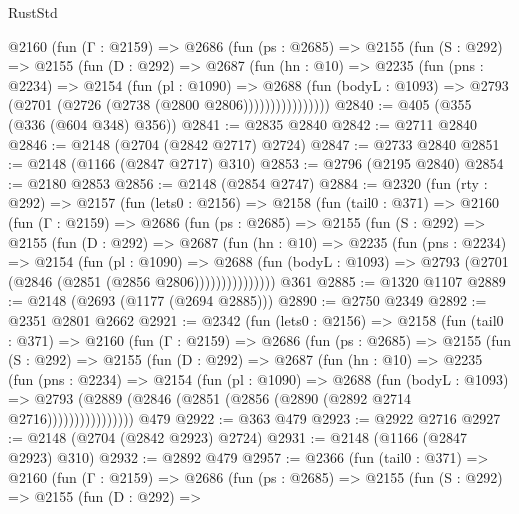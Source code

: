 \begin{lexlean}{RustStd}
\begin{coremodule}
          @2160
            (fun (Γ : @2159) =>
            @2686
              (fun (ps : @2685) =>
              @2155
                (fun (S : @292) =>
                @2155
                  (fun (D : @292) =>
                  @2687
                    (fun (hn : @10) =>
                    @2235
                      (fun (pns : @2234) =>
                      @2154
                        (fun (pl : @1090) =>
                        @2688
                          (fun (bodyL : @1093) =>
                          @2793 (@2701 (@2726 (@2738 (@2800 @2806))))))))))))))))
@2840 := @405 (@355 (@336 (@604 @348) @356))
@2841 := @2835 @2840
@2842 := @2711 @2840
@2846 := @2148 (@2704 (@2842 @2717) @2724)
@2847 := @2733 @2840
@2851 := @2148 (@1166 (@2847 @2717) @310)
@2853 := @2796 (@2195 @2840)
@2854 := @2180 @2853
@2856 := @2148 (@2854 @2747)
@2884 := @2320
    (fun (rty : @292) =>
    @2157
      (fun (lets0 : @2156) =>
      @2158
        (fun (tail0 : @371) =>
        @2160
          (fun (Γ : @2159) =>
          @2686
            (fun (ps : @2685) =>
            @2155
              (fun (S : @292) =>
              @2155
                (fun (D : @292) =>
                @2687
                  (fun (hn : @10) =>
                  @2235
                    (fun (pns : @2234) =>
                    @2154
                      (fun (pl : @1090) =>
                      @2688
                        (fun (bodyL : @1093) =>
                        @2793 (@2701 (@2846 (@2851 (@2856 @2806)))))))))))))))
    @361
@2885 := @1320 @1107
@2889 := @2148 (@2693 (@1177 (@2694 @2885)))
@2890 := @2750 @2349
@2892 := @2351 @2801 @2662
@2921 := @2342
    (fun (lets0 : @2156) =>
    @2158
      (fun (tail0 : @371) =>
      @2160
        (fun (Γ : @2159) =>
        @2686
          (fun (ps : @2685) =>
          @2155
            (fun (S : @292) =>
            @2155
              (fun (D : @292) =>
              @2687
                (fun (hn : @10) =>
                @2235
                  (fun (pns : @2234) =>
                  @2154
                    (fun (pl : @1090) =>
                    @2688
                      (fun (bodyL : @1093) =>
                      @2793 (@2889 (@2846 (@2851 (@2856 (@2890 (@2892 @2714 @2716))))))))))))))))
    @479
@2922 := @363 @479
@2923 := @2922 @2716
@2927 := @2148 (@2704 (@2842 @2923) @2724)
@2931 := @2148 (@1166 (@2847 @2923) @310)
@2932 := @2892 @479
@2957 := @2366
    (fun (tail0 : @371) =>
    @2160
      (fun (Γ : @2159) =>
      @2686
        (fun (ps : @2685) =>
        @2155
          (fun (S : @292) =>
          @2155
            (fun (D : @292) =>

\end{coremodule}
\end{lexlean}
